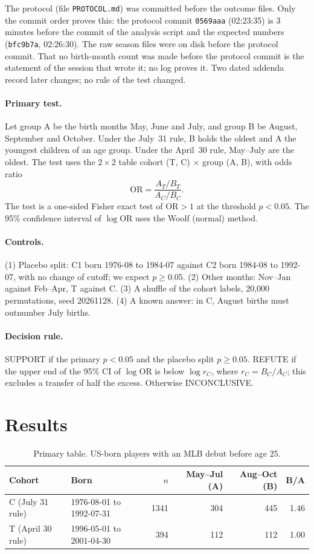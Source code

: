 \documentclass[11pt]{article}
\begin{document}
The protocol (file \texttt{PROTOCOL.md}) was committed before the outcome files. Only the commit order proves this: the protocol commit \texttt{0569aaa} (02:23:35) is 3 minutes before the commit of the analysis script and the expected numbers (\texttt{bfc9b7a}, 02:26:30). The raw season files were on disk before the protocol commit. That no birth-month count was made before the protocol commit is the statement of the session that wrote it; no log proves it. Two dated addenda record later changes; no rule of the test changed.

\paragraph{Primary test.} Let group A be the birth months May, June and July, and group B be August, September and October. Under the July~31 rule, B holds the oldest and A the youngest children of an age group. Under the April~30 rule, May--July are the oldest. The test uses the $2\times2$ table cohort (T, C) $\times$ group (A, B), with odds ratio
\[
\mathrm{OR} = \frac{A_T / B_T}{A_C / B_C}.
\]
The test is a one-sided Fisher exact test of $\mathrm{OR} > 1$ at the threshold $p < 0.05$. The 95\% confidence interval of $\log \mathrm{OR}$ uses the Woolf (normal) method.

\paragraph{Controls.}
(1) Placebo split: C1 born 1976-08 to 1984-07 against C2 born 1984-08 to 1992-07, with no change of cutoff; we expect $p \ge 0.05$.
(2) Other months: Nov--Jan against Feb--Apr, T against C.
(3) A shuffle of the cohort labels, 20{,}000 permutations, seed 20261128.
(4) A known answer: in C, August births must outnumber July births.

\paragraph{Decision rule.} SUPPORT if the primary $p < 0.05$ and the placebo split $p \ge 0.05$. REFUTE if the upper end of the 95\% CI of $\log\mathrm{OR}$ is below $\log r_C$, where $r_C = B_C/A_C$; this excludes a transfer of half the excess. Otherwise INCONCLUSIVE.

\section{Results}

\begin{table}[ht]
\centering
\caption{Primary table. US-born players with an MLB debut before age 25.}
\label{tab:primary}
\begin{tabular}{llrrrr}
\toprule
Cohort & Born & $n$ & May--Jul (A) & Aug--Oct (B) & B/A \\
\midrule
C (July 31 rule) & 1976-08-01 to 1992-07-31 & 1341 & 304 & 445 & 1.46 \\
T (April 30 rule) & 1996-05-01 to 2001-04-30 & 394 & 112 & 112 & 1.00 \\
\bottomrule
\end{tabular}
\end{table}
\end{document}

